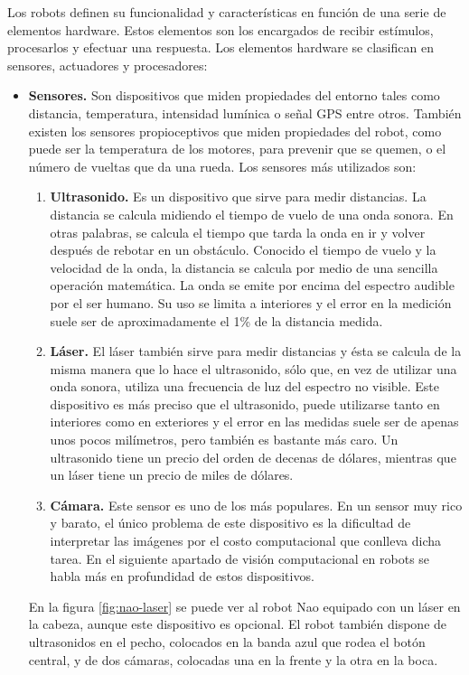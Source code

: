 Los robots definen su funcionalidad y características en función de una serie de elementos hardware. Estos elementos son los encargados de recibir estímulos, procesarlos y efectuar una respuesta. Los elementos hardware se clasifican en sensores, actuadores y procesadores: 

\begin{itemize}
  \item \textbf{Sensores.} Son dispositivos que miden propiedades del entorno tales como distancia, temperatura, intensidad lumínica o señal GPS entre otros. También existen los sensores propioceptivos que miden propiedades del robot, como puede ser la temperatura de los motores, para prevenir que se quemen, o el número de vueltas que da una rueda. Los sensores más utilizados son: 
    \begin{enumerate}
      \item \textbf{Ultrasonido.} Es un dispositivo que sirve para medir distancias. La distancia se calcula midiendo el tiempo de vuelo de una onda sonora. En otras palabras, se calcula el tiempo que tarda la onda en ir y volver después de rebotar en un obstáculo. Conocido el tiempo de vuelo y la velocidad de la onda, la distancia se calcula por medio de una sencilla operación matemática. La onda se emite por encima del espectro audible por el ser humano. Su uso se limita a interiores y el error en la medición suele ser de aproximadamente el 1\% de la distancia medida. 
      \item \textbf{Láser.} El láser también sirve para medir distancias y ésta se calcula de la misma manera que lo hace el ultrasonido, sólo que, en vez de utilizar una onda sonora, utiliza una frecuencia de luz del espectro no visible. Este dispositivo es más preciso que el ultrasonido, puede utilizarse tanto en interiores como en exteriores y el error en las medidas suele ser de apenas unos pocos milímetros, pero también es bastante más caro. Un ultrasonido tiene un precio del orden de decenas de dólares, mientras que un láser tiene un precio de miles de dólares.
      \item \textbf{Cámara.} Este sensor es uno de los más populares. En un sensor muy rico y barato, el único problema de este dispositivo es la dificultad de interpretar las imágenes por el costo computacional que conlleva dicha tarea. En el siguiente apartado de visión computacional en robots se habla más en profundidad de estos dispositivos.
  \end{enumerate}
En la figura \ref{fig:nao-laser} se puede ver al robot Nao equipado con un láser en la cabeza, aunque este dispositivo es opcional. El robot también dispone de ultrasonidos en el pecho, colocados en la banda azul que rodea el botón central, y de dos cámaras, colocadas una en la frente y la otra en la boca.


\end{itemize}
